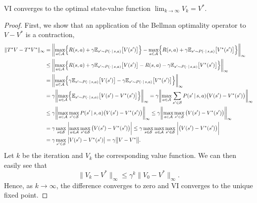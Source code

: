 		\begin{theorem}
			\ac{VI} converges to the optimal state-value function \( \lim_{k \to \infty} V_k = V^\ast \).
		\end{theorem}
		\begin{proof}
			First, we show that an application of the Bellman optimality operator to \(V - V^\ast\) is a contraction,
			\begin{align}
				\lVert T^\ast V - T^\ast V^\ast \rVert_\infty
					&= \biggl\lVert \max_{a \in \mathcal{A}} \Bigl\{ R(s, a) + \gamma \mathbb{E}_{s' \sim P(\cdot \,\vert\, s, a)}\bigl[ V(s') \bigr] \Bigr\} - \max_{a \in \mathcal{A}} \Bigl\{ R(s, a) + \gamma \mathbb{E}_{s' \sim P(\cdot \,\vert\, s, a)}\bigl[ V^\ast(s') \bigr] \Bigr\} \biggr\rVert_\infty \\
					&\leq \biggl\lVert \max_{a \in \mathcal{A}} \Bigl\{ R(s, a) + \gamma \mathbb{E}_{s' \sim P(\cdot \,\vert\, s, a)}\bigl[ V(s') \bigr] - R(s, a) - \gamma \mathbb{E}_{s' \sim P(\cdot \,\vert\, s, a)}\bigl[ V^\ast(s') \bigr] \Bigr\} \biggr\rVert_\infty \\
					&= \biggl\lVert \max_{a \in \mathcal{A}} \Bigl\{ \gamma \mathbb{E}_{s' \sim P(\cdot \,\vert\, s, a)}\bigl[ V(s') \bigr] - \gamma \mathbb{E}_{s' \sim P(\cdot \,\vert\, s, a)}\bigl[ V^\ast(s') \bigr] \Bigr\} \biggr\rVert_\infty \\
					&= \gamma \biggl\lVert \max_{a \in \mathcal{A}} \Bigl\{ \mathbb{E}_{s' \sim P(\cdot \,\vert\, s, a)}\bigl[ V(s') - V^\ast(s') \bigr] \Bigr\} \biggr\rVert_\infty
					 = \gamma \biggl\lVert \max_{a \in \mathcal{A}} \sum_{s' \in \mathcal{S}} P(s' \,\vert\, s, a) \bigl( V(s') - V^\ast(s') \bigr) \biggr\rVert_\infty \\
					&\leq \gamma \biggl\lVert \max_{a \in \mathcal{A}} \max_{s' \in \mathcal{S}} P(s' \,\vert\, s, a) \bigl( V(s') - V^\ast(s') \bigr) \biggr\rVert_\infty
					 \leq \gamma \biggl\lVert \max_{a \in \mathcal{A}} \max_{s' \in \mathcal{S}} \, \bigl( V(s') - V^\ast(s') \bigr) \biggr\rVert_\infty \\
					&= \gamma \max_{s \in \mathcal{S}} \; \biggl\lvert \max_{a \in \mathcal{A}} \max_{s' \in \mathcal{S}} \, \bigl( V(s') - V^\ast(s') \bigr) \biggr\rvert
					 \leq \gamma \max_{s \in \mathcal{S}} \max_{a \in \mathcal{A}} \max_{s' \in \mathcal{S}} \; \biggl\lvert \bigl( V(s') - V^\ast(s') \bigr) \biggr\rvert \\
					&= \gamma \max_{s' \in \mathcal{S}} \; \bigl\lvert V(s') - V^\ast(s') \bigr\rvert
					 = \gamma \bigl\lVert V - V^\ast \bigr\rVert.
			\end{align}
			Let \(k\) be the iteration and \(V_k\) the corresponding value function. We can then easily see that
			\begin{equation}
				\lVert V_k - V^\ast \rVert_\infty \leq \gamma^k \lVert V_0 - V^\ast \rVert_\infty.
			\end{equation}
			Hence, as \(k \to \infty\), the difference converges to zero and \ac{VI} converges to the unique fixed point.
		\end{proof}

